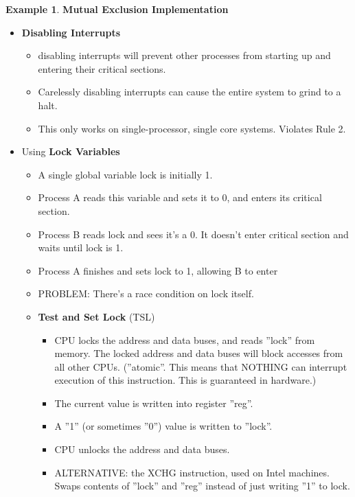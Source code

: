 \documentclass[12pt,a4paper]{article}
\theoremstyle{definition}
\newtheorem{example}{Example}[section]
\newenvironment{myitemize}
{ \begin{itemize}
    \setlength{\itemsep}{5pt}
    \setlength{\parskip}{0pt}
    \setlength{\parsep}{0pt}     }
{ \end{itemize}                  }
\begin{document}
\begin{example}{\textbf{Mutual Exclusion Implementation}}
	\begin{myitemize}
		\item \textbf{Disabling Interrupts}
		\begin{myitemize}
			\item disabling interrupts will prevent other processes from starting up and entering their critical sections.
			\item Carelessly disabling interrupts can cause the entire system to grind to a halt.
			\item This only works on single-processor, single core systems. Violates Rule 2.
		\end{myitemize}
		\item Using \textbf{Lock Variables}
		\begin{myitemize}
			\item A single global variable \textsf{lock} is initially 1.
			\item Process A reads this variable and sets it to 0, and enters its critical section.
			\item Process B reads \textsf{lock} and sees it’s a 0. It doesn’t enter critical section and waits until \textsf{lock} is 1.
			\item Process A finishes and sets \textsf{lock} to 1, allowing B to enter
			\item PROBLEM: There’s a race condition on \textsf{lock}  itself.
			\item \textbf{Test and Set Lock} (\textsf{TSL})
			\begin{myitemize}
				\item CPU locks the address and data buses, and reads ''lock'' from memory. The locked address and data buses will block accesses from all other CPUs. (''atomic''. This means that NOTHING can interrupt execution of this instruction. This is guaranteed in hardware.)
				\item The current value is written into register ''reg''.
				\item A ''1'' (or sometimes ''0'') value is written to ''lock''.
				\item CPU unlocks the address and data buses.
				\item ALTERNATIVE: the XCHG instruction, used on Intel machines. Swaps contents of ''lock'' and ''reg'' instead of just writing ''1'' to lock.
			\end{myitemize}
		\end{myitemize}
		\begin{tcolorbox}

\end{tcolorbox}
\end{myitemize}
\end{example}
\end{document}
